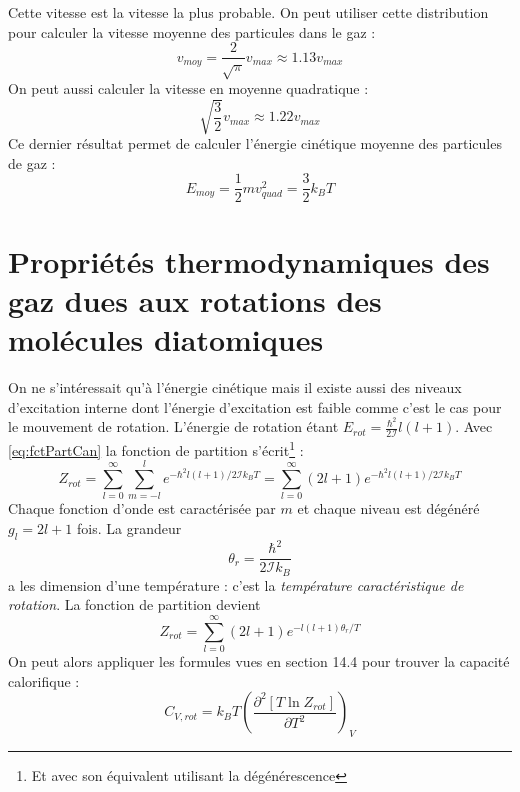 \documentclass	[11pt, a4paper, openany]{book}
\begin{document}
		Cette vitesse est la vitesse la plus probable. On peut utiliser cette distribution pour calculer 
		la vitesse moyenne des particules dans le gaz :
		\begin{equation}
			v_{moy} = \frac{2}{\sqrt{\pi}}v_{max} \approx 1.13 v_{max}
		\end{equation}
		On peut aussi calculer la vitesse en moyenne quadratique :
		\begin{equation}
			\sqrt{\frac{3}{2}}v_{max} \approx 1.22 v_{max}
		\end{equation}
		Ce dernier résultat permet de calculer l'énergie cinétique moyenne des particules de gaz :
		\begin{equation}
			E_{moy} = \frac{1}{2}mv^2_{quad} = \frac{3}{2}k_BT
		\end{equation}
		
		\section{Propriétés thermodynamiques des gaz dues aux rotations des molécules diatomiques}
		On ne s'intéressait qu'à l'énergie cinétique mais il existe aussi des niveaux d'excitation 
		interne dont l'énergie d'excitation est faible comme c'est le cas pour le mouvement de 
		rotation. L'énergie de rotation étant $E_{rot} = \frac{\hbar^2}{2\mathcal{I}}l(l+1)$. Avec
		\autoref{eq:fctPartCan} la fonction de partition s'écrit\footnote{Et avec son équivalent 
		utilisant la dégénérescence} :
		\begin{equation}
			Z_{rot} = \sum_{l=0}^\infty\sum_{m=-l}^l e^{-\hbar^2l(l+1)/2\mathcal{I}k_BT} = \sum_{
				l=0}^\infty (2l+1)e^{-\hbar^2l(l+1)/2\mathcal{I}k_BT}
		\end{equation}
		Chaque fonction d'onde est caractérisée par $m$ et chaque niveau est dégénéré $g_l = 2l
		+1$ fois. La grandeur
		\begin{equation}
			\theta_r = \frac{\hbar^2}{2\mathcal{I}k_B}
		\end{equation}
		a les dimension d'une température : c'est la \textit{température caractéristique de 
		rotation}. La fonction de partition devient 
		\begin{equation}
			Z_{rot} = \sum_{l=0}^\infty (2l+1)e^{-l(l+1)\theta_r/T}
			\label{eq:zrot}
		\end{equation}
		On peut alors appliquer les formules vues en section 14.4 pour trouver la capacité 
		calorifique :
		\begin{equation}
			C_{V,rot} = k_BT\left(\dfrac{\partial^2[T\ln Z_{rot}]}{\partial T^2}\right)_V
		\end{equation}
\end{document}
